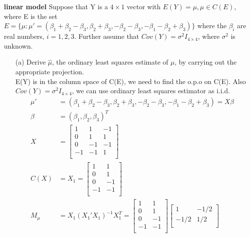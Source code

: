\documentclass{homework}
\begin{document}
\exercise
\textbf{linear model} Suppose that Y is a $4 \times 1$ vector with $E(Y ) = \mu, \mu \in C(E)$, where E is the set $E = \{ \mu: \mu' = (\beta_1 + \beta_2 - \beta_3, \beta_2 + \beta_3, -\beta_2 - \beta_3, -\beta_1-\beta_2 + \beta_3) \} $ where the $\beta_i$ are real numbers, $i = 1, 2, 3$. Further assume that $Cov(Y) = \sigma^2I_{4 \times 4}$, where $\sigma^2$ is unknown.\\
\begin{itemize}
    \item [(a)] Derive $\hat\mu$, the ordinary least squares estimate of $\mu$, by carrying out the
appropriate projection.\\
E(Y) is in the column space of C(E), we need to find the o.p.o on C(E). Also $Cov(Y) = \sigma^2 I_{4 \times 4}$, we can use ordinary least squares estimator as i.i.d.
\begin{align*}
    \mu' &= (\beta_1 + \beta_2 - \beta_3, \beta_2 + \beta_3, -\beta_2 - \beta_3, -\beta_1-\beta_2 + \beta_3) = X \beta\\
    \beta &= (\beta_1, \beta_2, \beta_3)^T\\
    X &= \begin{bmatrix}
           1  & 1 & -1  \\
           0 &  1 & 1\\
           0  & -1 & -1  \\
           -1 &  -1 & 1\\
         \end{bmatrix}\\
    C(X) &= X_1 = \begin{bmatrix}
           1  & 1   \\
           0 &  1 \\
           0  & -1  \\
           -1 &  -1 \\
         \end{bmatrix}\\
    M_{\mu} &= X_1(X_1'X_{1})^{-1} X_{1}^T = \begin{bmatrix}
           1  & 1   \\
           0 &  1 \\
           0  & -1  \\
           -1 &  -1 \\
         \end{bmatrix}\begin{bmatrix}
           1  & -1/2   \\
           -1/2 &  1/2 \\

\end{bmatrix}
\end{align*}
\end{itemize}
\end{document}

